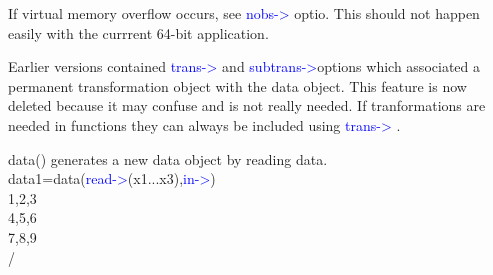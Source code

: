 \begin{note}
If virtual memory overflow occurs, see \textcolor{blue}{nobs->} optio. This should not happen easily with the currrent
64-bit application.
\end{note}
\begin{note}
Earlier versions contained \textcolor{blue}{trans->} and \textcolor{blue}{subtrans->}options which associated
a permanent transformation object with the data object. This feature is now deleted because
it may confuse and is not really needed. If tranformations are needed in functions
they can always be included using \textcolor{blue}{trans->} .
\end{note}
\begin{example}[dataex]data() generates a new data object by reading data.\\
\label{dataex}
data1=\textcolor{VioletRed}{data}(\textcolor{blue}{read->}(x1...x3),\textcolor{blue}{in->})\\
1,2,3\\
4,5,6\\
7,8,9\\
/
\end{example}
